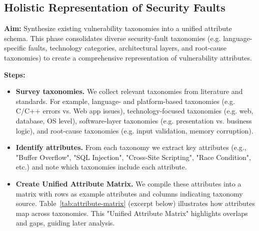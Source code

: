 \subsection{Holistic Representation of Security Faults} \textbf{Aim:} Synthesize existing vulnerability taxonomies into a unified attribute schema. This phase consolidates diverse security-fault taxonomies (e.g. language-specific faults, technology categories, architectural layers, and root-cause taxonomies) to create a comprehensive representation of vulnerability attributes.
\newline





\textbf{Steps:}

\begin{itemize}
    \item \textbf{Survey taxonomies.} We collect relevant taxonomies from literature and standards. For example, language- and platform-based taxonomies (e.g. C/C++ errors vs. Web app issues), technology-focused taxonomies (e.g. web, database, OS level), software-layer taxonomies (e.g. presentation vs. business logic), and root-cause taxonomies (e.g. input validation, memory corruption).
    \item \textbf{Identify attributes.} From each taxonomy we extract key attributes (e.g., "Buffer Overflow", "SQL Injection", "Cross-Site Scripting", "Race Condition", etc.) and note which taxonomies include each attribute.
    \item \textbf{Create Unified Attribute Matrix.} We compile these attributes into a matrix with rows as example attributes and columns indicating taxonomy source. Table~\ref{tab:attribute-matrix} (excerpt below) illustrates how attributes map across taxonomies. This "Unified Attribute Matrix" highlights overlaps and gaps, guiding later analysis.
\end{itemize}

